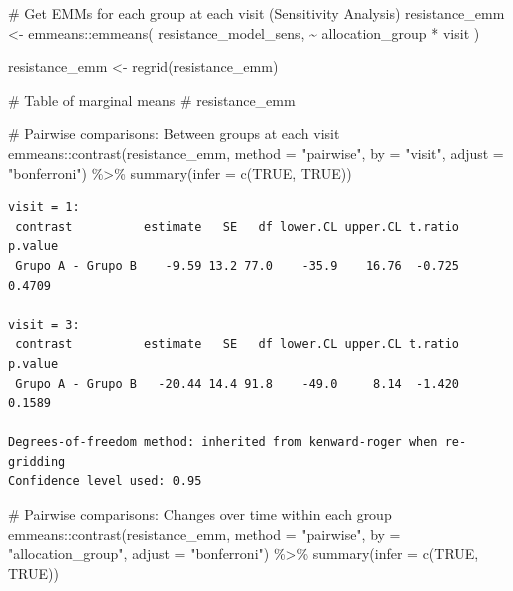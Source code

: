 \documentclass[
  12pt,
]{article}
\newenvironment{Shaded}{\begin{snugshade}}{\end{snugshade}}
\newcommand{\AttributeTok}[1]{\textcolor[rgb]{0.40,0.45,0.13}{#1}}
\newcommand{\CommentTok}[1]{\textcolor[rgb]{0.37,0.37,0.37}{#1}}
\newcommand{\ConstantTok}[1]{\textcolor[rgb]{0.56,0.35,0.01}{#1}}
\newcommand{\FunctionTok}[1]{\textcolor[rgb]{0.28,0.35,0.67}{#1}}
\newcommand{\NormalTok}[1]{\textcolor[rgb]{0.00,0.23,0.31}{#1}}
\newcommand{\OtherTok}[1]{\textcolor[rgb]{0.00,0.23,0.31}{#1}}
\newcommand{\SpecialCharTok}[1]{\textcolor[rgb]{0.37,0.37,0.37}{#1}}
\newcommand{\StringTok}[1]{\textcolor[rgb]{0.13,0.47,0.30}{#1}}
\begin{document}
\begin{Shaded}
\begin{Highlighting}[]
\CommentTok{\# Get EMMs for each group at each visit (Sensitivity Analysis)}
\NormalTok{resistance\_emm }\OtherTok{\textless{}{-}}\NormalTok{ emmeans}\SpecialCharTok{::}\FunctionTok{emmeans}\NormalTok{(}
\NormalTok{    resistance\_model\_sens, }
    \SpecialCharTok{\textasciitilde{}}\NormalTok{ allocation\_group }\SpecialCharTok{*}\NormalTok{ visit}
\NormalTok{)}

\NormalTok{resistance\_emm }\OtherTok{\textless{}{-}} \FunctionTok{regrid}\NormalTok{(resistance\_emm)}

\CommentTok{\# Table of marginal means}
\CommentTok{\# resistance\_emm}

\CommentTok{\# Pairwise comparisons: Between groups at each visit}
\NormalTok{emmeans}\SpecialCharTok{::}\FunctionTok{contrast}\NormalTok{(resistance\_emm,}
\AttributeTok{method =} \StringTok{"pairwise"}\NormalTok{, }\AttributeTok{by =} \StringTok{"visit"}\NormalTok{,}
\AttributeTok{adjust =} \StringTok{"bonferroni"}\NormalTok{) }\SpecialCharTok{\%\textgreater{}\%} \FunctionTok{summary}\NormalTok{(}\AttributeTok{infer =} \FunctionTok{c}\NormalTok{(}\ConstantTok{TRUE}\NormalTok{, }\ConstantTok{TRUE}\NormalTok{))}
\end{Highlighting}
\end{Shaded}

\begin{verbatim}
visit = 1:
 contrast          estimate   SE   df lower.CL upper.CL t.ratio p.value
 Grupo A - Grupo B    -9.59 13.2 77.0    -35.9    16.76  -0.725  0.4709

visit = 3:
 contrast          estimate   SE   df lower.CL upper.CL t.ratio p.value
 Grupo A - Grupo B   -20.44 14.4 91.8    -49.0     8.14  -1.420  0.1589

Degrees-of-freedom method: inherited from kenward-roger when re-gridding 
Confidence level used: 0.95 
\end{verbatim}

\begin{Shaded}
\begin{Highlighting}[]
\CommentTok{\# Pairwise comparisons: Changes over time within each group}
\NormalTok{emmeans}\SpecialCharTok{::}\FunctionTok{contrast}\NormalTok{(resistance\_emm,}
\AttributeTok{method =} \StringTok{"pairwise"}\NormalTok{, }\AttributeTok{by =} \StringTok{"allocation\_group"}\NormalTok{,}
\AttributeTok{adjust =} \StringTok{"bonferroni"}\NormalTok{) }\SpecialCharTok{\%\textgreater{}\%} \FunctionTok{summary}\NormalTok{(}\AttributeTok{infer =} \FunctionTok{c}\NormalTok{(}\ConstantTok{TRUE}\NormalTok{, }\ConstantTok{TRUE}\NormalTok{))}
\end{Highlighting}
\end{Shaded}
\end{document}
